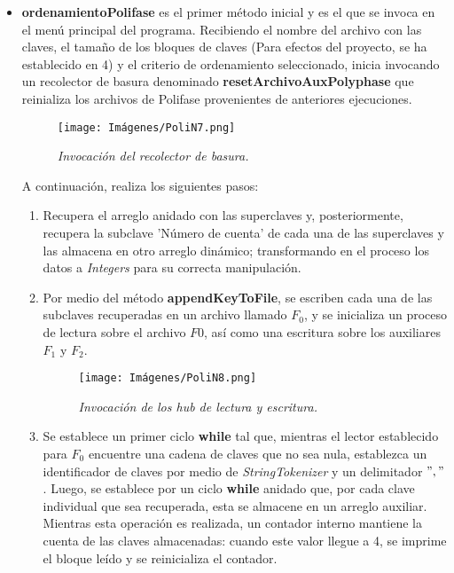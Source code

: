 \documentclass[letterpaper,12pt]{extarticle}
\begin{document}
\begin{itemize}
\item \textbf{ordenamientoPolifase} es el primer método inicial y es el que se invoca en el menú principal del programa. Recibiendo el nombre del archivo con las claves, el tamaño de los bloques de claves (Para efectos del proyecto, se ha establecido en 4) y el criterio de ordenamiento seleccionado, inicia invocando un recolector de basura denominado \textbf{resetArchivoAuxPolyphase} que reinializa los archivos de Polifase provenientes de anteriores ejecuciones.

\begin{figure}[h!]
\centering
\texttt{[image: Imágenes/PoliN7.png]}
\caption{\textit{Invocación del recolector de basura.}}
\label{fig:PoliN7}
\end{figure}

A continuación, realiza los siguientes pasos:

\begin{enumerate}
\item Recupera el arreglo anidado con las superclaves y, posteriormente, recupera la subclave 'Número de cuenta' de cada una de las superclaves y las almacena en otro arreglo dinámico; transformando en el proceso los datos a \textit{Integers} para su correcta manipulación. 

\item Por medio del método \textbf{appendKeyToFile}, se escriben cada una de las subclaves recuperadas en un archivo llamado $F_{0}$, y se inicializa un proceso de lectura sobre el archivo $F0$, así como una escritura sobre los auxiliares $F_{1}$ y $F_{2}$.

\begin{figure}[h!]
\centering
\texttt{[image: Imágenes/PoliN8.png]}
\caption{\textit{Invocación de los hub de lectura y escritura.}}
\label{fig:PoliN8}
\end{figure}

\pagebreak

\item Se establece un primer ciclo \textbf{while} tal que, mientras el lector establecido para $F_{0}$ encuentre una cadena de claves que no sea nula, establezca un identificador de claves por medio de \textit{StringTokenizer} y un delimitador $","$. Luego, se establece por un ciclo \textbf{while} anidado que, por cada clave individual que sea recuperada, esta se almacene en un arreglo auxiliar. Mientras esta operación es realizada, un contador interno mantiene la cuenta de las claves almacenadas: cuando este valor llegue a 4, se imprime el bloque leído y se reinicializa el contador. 


\end{enumerate}
\end{itemize}
\end{document}
